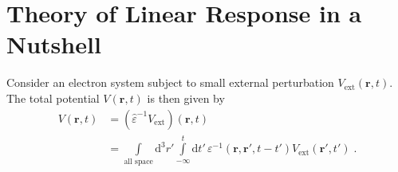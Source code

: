 \documentclass[a4paper,12pt]{article}
\begin{document}
\section{Theory of Linear Response in a Nutshell}
    Consider an electron system subject to small external perturbation $V_\text{ext}(\mathbf{r}, t)$. The total potential $V(\mathbf{r}, t)$ is then given by
    \begin{equation*}
        \begin{aligned}
        V(\mathbf{r}, t) 
            &= \left( \hat\varepsilon^{-1} V_\text{ext} \right)(\mathbf{r}, t) \\
            &= \int\limits_{\text{all space}}\!\!\!\!\!\! \text{d}^3 r' \int\limits_{-\infty}^{t}\!\! \text{d} t'\, \varepsilon^{-1}(\mathbf{r}, \mathbf{r'}, t - t') V_\text{ext}(\mathbf{r'}, t')\; .
        \end{aligned}
    \end{equation*}
\end{document}
